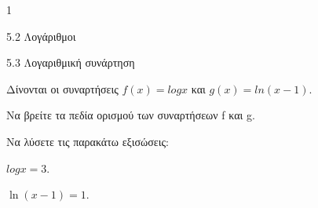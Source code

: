 \begin{ylh}{1}
\item 5.2 Λογάριθμοι
\item 5.3 Λογαριθμική συνάρτηση
\end{ylh}
Δίνονται οι συναρτήσεις $f(x) = logx$ και $g(x) = ln(x - 1)$.
\begin{alist}
\item Να βρείτε τα πεδία ορισμού των συναρτήσεων f και g.
\item Να λύσετε τις παρακάτω εξισώσεις:
\begin{rlist}
\item $logx = 3.$
\item $\ln(x - 1) = 1.$
\end{rlist}
\end{alist}

